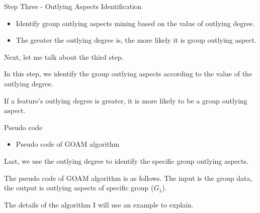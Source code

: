 \documentclass[
size=14pt,
paper=smartboard,  %
mode=present, 		%
display=slides, 	%
style=tuliplab,  	%
pauseslide,
fleqn,leqno]{powerdot}
\begin{document}
\begin{slide}{Step Three - Outlying Aspects Identification}
	\begin{itemize}
		\item
		Identify group outlying aspects mining based on the value
		of outlying degree.
		
		\item
		The greater the outlying degree is,
		the more likely it is group outlying aspect.
	\end{itemize}
	
	\begin{note}
		Next,
		let me talk about the third step.
		
		In this step,
		we identify the group outlying aspects according to the value of the outlying degree.
		
		If a feature's outlying degree is greater,
		it is more likely to be a group outlying aspect.
	\end{note}
	
\end{slide}


\begin{slide}[toc=,bm=]{Pseudo code}
	
	\begin{itemize}
		\item
		Pseudo code of GOAM algorithm
		
	\end{itemize}
	
	\begin{figure}
		\centering
	\end{figure}
	
	\begin{note}
		Last,
		we use the outlying degree to identify the specific group outlying aspects.
		
		The pseudo code of GOAM algorithm is as follows.
		The input is the group data,
		the output is outlying aspects of specific group ($G_1$).
		
		The details of the algorithm I will use an example to explain.
	\end{note}
	
\end{slide}
\end{document}
